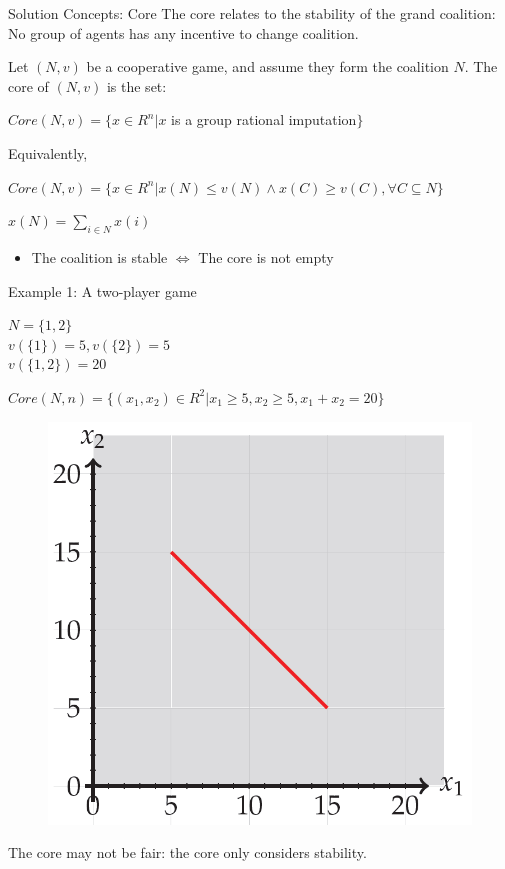 \documentclass{beamer}
\begin{document}
\begin{frame} {Solution Concepts: Core}
    The core relates to the stability of the grand coalition: \\ No group of agents has any incentive to change coalition.
    \begin{definition}\label{dfn:core}
        Let $(N,v)$ be a cooperative game, and assume they form the coalition $N$. The core of $(N,v)$ is the set:
        \vspace{0.1cm}
        \begin{center}
            $Core(N,v) = \{x \in R^n | x$ is a group rational imputation$\}$
        \end{center}
        Equivalently,
        \vspace{0.1cm}
        \begin{center}
            $Core(N,v) = \{x \in R^n | x(N) \leq v(N) \wedge x(C) \geq v(C), \forall C \subseteq N\}$ \\
        \end{center}
        \small{$x(N) = \sum_{i \in N} x(i)$}
    \end{definition}

    \begin{itemize}
       \item The coalition is stable $\Leftrightarrow$ The core is not empty
    \end{itemize}

\end{frame}
\begin{frame} {Example 1: A two-player game}

    \begin{center}
      $N = \{1,2\}$ \\
      $v(\{1\}) = 5, v(\{2\}) = 5$ \\
      $v(\{1,2\}) = 20$ \\
    \end{center}

    $Core(N,n) = \{(x_1,x_2) \in R^2 | x_1 \geq 5, x_2 \geq 5, x_1 + x_2 = 20\}$

    \begin{figure}[htbp]
        \centering
        \includegraphics[width=0.3 \columnwidth]{figures/coreex1.png}
    \end{figure}

    The core may not be fair: the core only considers stability.

\end{frame}
\end{document}
